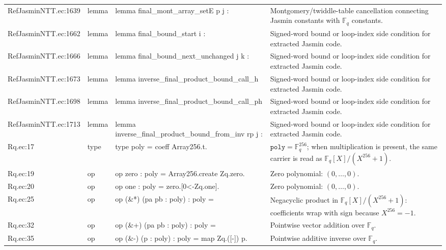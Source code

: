 \documentclass[10pt]{article}
\begin{document}
\begin{longtable}{L{0.11\textwidth}L{0.05\textwidth}L{0.38\textwidth}L{0.42\textwidth}}
RefJasminNTT.\allowbreak{}ec:\allowbreak{}1639 & lemma & {\ttfamily\scriptsize lemma final\_mont\_array\_setE p j :} & Montgomery/twiddle-table cancellation connecting Jasmin constants with $\mathbb F_q$ constants. \\
RefJasminNTT.\allowbreak{}ec:\allowbreak{}1662 & lemma & {\ttfamily\scriptsize lemma final\_bound\_start i :} & Signed-word bound or loop-index side condition for extracted Jasmin code. \\
RefJasminNTT.\allowbreak{}ec:\allowbreak{}1666 & lemma & {\ttfamily\scriptsize lemma final\_bound\_next\_unchanged j k :} & Signed-word bound or loop-index side condition for extracted Jasmin code. \\
RefJasminNTT.\allowbreak{}ec:\allowbreak{}1673 & lemma & {\ttfamily\scriptsize lemma inverse\_final\_product\_bound\_call\_h} & Signed-word bound or loop-index side condition for extracted Jasmin code. \\
RefJasminNTT.\allowbreak{}ec:\allowbreak{}1698 & lemma & {\ttfamily\scriptsize lemma inverse\_final\_product\_bound\_call\_ph} & Signed-word bound or loop-index side condition for extracted Jasmin code. \\
RefJasminNTT.\allowbreak{}ec:\allowbreak{}1713 & lemma & {\ttfamily\scriptsize lemma inverse\_final\_product\_bound\_from\_inv rp j :} & Signed-word bound or loop-index side condition for extracted Jasmin code. \\
Rq.\allowbreak{}ec:\allowbreak{}17 & type & {\ttfamily\scriptsize type poly = coeff Array256.t.} & $\mathtt{poly}=\mathbb F_q^{256}$; when multiplication is present, the same carrier is read as $\mathbb F_q[X]/(X^{256}+1)$. \\
Rq.\allowbreak{}ec:\allowbreak{}19 & op & {\ttfamily\scriptsize op zero : poly = Array256.create Zq.zero.} & Zero polynomial: $(0,\ldots,0)$. \\
Rq.\allowbreak{}ec:\allowbreak{}20 & op & {\ttfamily\scriptsize op one : poly = zero.[0<-Zq.one].} & Zero polynomial: $(0,\ldots,0)$. \\
Rq.\allowbreak{}ec:\allowbreak{}25 & op & {\ttfamily\scriptsize op (\&*) (pa pb : poly) : poly =} & Negacyclic product in $\mathbb F_q[X]/(X^{256}+1)$: coefficients wrap with sign because $X^{256}=-1$. \\
Rq.\allowbreak{}ec:\allowbreak{}32 & op & {\ttfamily\scriptsize op (\&+) (pa pb : poly) : poly =} & Pointwise vector addition over $\mathbb F_q$. \\
Rq.\allowbreak{}ec:\allowbreak{}35 & op & {\ttfamily\scriptsize op (\&-) (p : poly) : poly =  map Zq.([-]) p.} & Pointwise additive inverse over $\mathbb F_q$. \\

\end{longtable}
\end{document}

